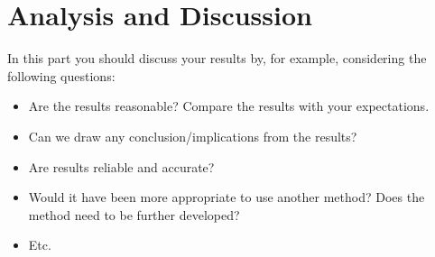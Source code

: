 \section{Analysis and Discussion} %
\label{sec:analysis_and_discussion}
In this part you should discuss your results by, for example, considering the following questions:
\begin{itemize}
	\item Are the results reasonable? Compare the results with your expectations.
	\item Can we draw any conclusion/implications from the results?
	\item Are results reliable and accurate?
	\item Would it have been more appropriate to use another method? Does the method need to be further developed?
	\item Etc.
\end{itemize}

